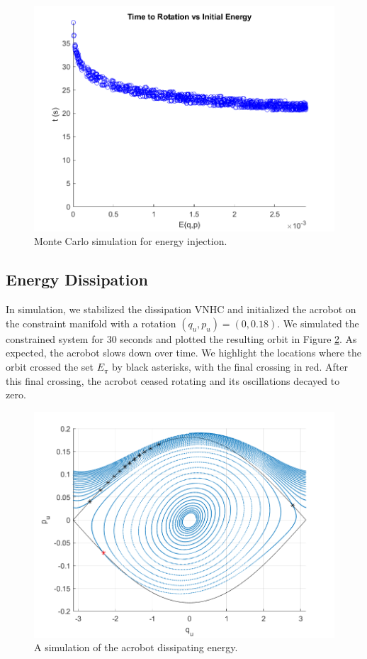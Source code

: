 \documentclass[journal,twoside,web, twocolumn,draftcls]{ieeecolor}
\begin{document}
\begin{figure}[]
    \centering
    \includegraphics[width=0.8\linewidth]{acrobot_mc.png}
    \caption{Monte Carlo simulation for energy injection.}
    \label{fig:acrobot-mc}
\end{figure}

\subsection{Energy Dissipation}

In simulation, we stabilized the dissipation VNHC and initialized the acrobot on
the constraint manifold with a rotation \((q_u,p_u) = (0,0.18)\).
We simulated the constrained system for \(30\) seconds and plotted the
resulting orbit in Figure \ref{fig:acrobot-diss-orbit}. 
As expected, the acrobot slows down over time.
We highlight the locations where the orbit crossed the set \(E_\pi\) by
black asterisks, with the final crossing in red.
After this final crossing, the acrobot ceased rotating and its oscillations
decayed to zero.

\begin{figure}
    \centering
    \includegraphics[width=0.8\linewidth]{acrobot_diss_orbit.png}
    \caption{A simulation of the acrobot dissipating energy.}
    \label{fig:acrobot-diss-orbit}
\end{figure}
\end{document}

